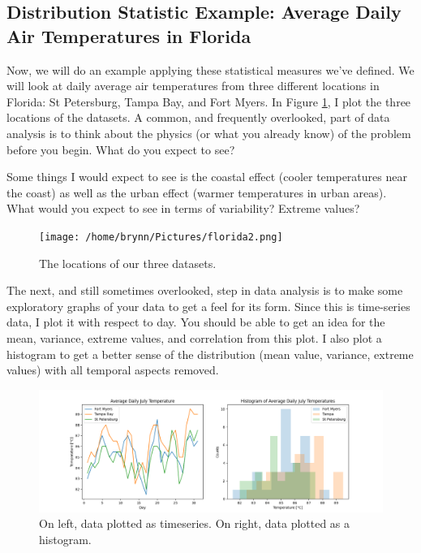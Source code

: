\documentclass{article}
\begin{document}
\subsection{Distribution Statistic Example: Average Daily Air Temperatures in Florida}
Now, we will do an example applying these statistical measures we've defined. We will look at daily average air temperatures from three different locations in Florida: St Petersburg, Tampa Bay, and Fort Myers. In Figure \ref{fig:florida}, I plot the three locations of the datasets. A common, and frequently overlooked, part of data analysis is to think about the physics (or what you already know) of the problem before you begin. What do you expect to see?

Some things I would expect to see is the coastal effect (cooler temperatures near the coast) as well as the urban effect (warmer temperatures in urban areas). What would you expect to see in terms of variability? Extreme values? 

\begin{figure}[htbp]
\centerline{\texttt{[image: /home/brynn/Pictures/florida2.png]}}
\caption[]{\label{fig:florida}The locations of our three datasets.}
\end{figure}


The next, and still sometimes overlooked, step in data analysis is to make some exploratory graphs of your data to get a feel for its form. Since this is time-series data, I plot it with respect to day. You should be able to get an idea for the mean, variance, extreme values, and correlation from this plot. I also plot a histogram to get a better sense of the  distribution (mean value, variance, extreme values) with all temporal aspects removed.

\begin{figure}[htbp]
\centerline{\includegraphics[width = \textwidth]{distex.png}}
\caption[]{\label{fig:ex} On left, data plotted as timeseries. On right, data plotted as a histogram. }
\end{figure}
\end{document}
